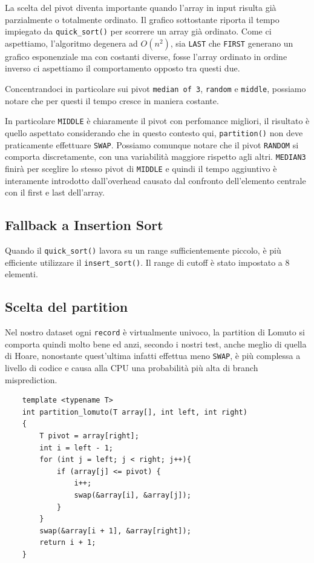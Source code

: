 \documentclass[12pt, letterpaper]{report}
\begin{document}
La scelta del pivot diventa importante quando l'array in input risulta già
parzialmente o totalmente ordinato.
Il grafico sottostante riporta il tempo impiegato da \verb|quick_sort()| 
per scorrere un array già ordinato. Come ci aspettiamo, l'algoritmo degenera ad
$O(n^2)$, sia \verb|LAST| che \verb|FIRST| generano un grafico esponenziale ma con
costanti diverse, fosse l'array ordinato in ordine inverso ci aspettiamo il comportamento
opposto tra questi due.
\begin{figure}[H]
\centering
    
\end{figure}
Concentrandoci in particolare sui pivot \verb|median of 3|, \verb|random| e \verb|middle|, 
possiamo notare che per questi il tempo cresce in maniera costante.  
\begin{figure}[H]
\centering
    
\end{figure}
In particolare \verb|MIDDLE| è chiaramente il pivot con perfomance migliori, 
il risultato è quello aspettato considerando che in questo contesto qui, 
\verb|partition()| non deve praticamente effettuare \verb|SWAP|. 
Possiamo comunque notare che il pivot \verb|RANDOM| si comporta discretamente, 
con una variabilità maggiore rispetto agli altri. \verb|MEDIAN3|
finirà per sceglire lo stesso pivot di \verb|MIDDLE| e quindi il tempo aggiuntivo
è interamente introdotto dall'overhead causato dal confronto dell'elemento centrale
con il first e last dell'array.

\newpage
\subsection{Fallback a Insertion Sort}
Quando il \verb|quick_sort()| lavora su un range sufficientemente piccolo, è più
efficiente utilizzare il \verb|insert_sort()|. Il range di cutoff è stato impostato a 8 elementi.

\subsection{Scelta del partition}
Nel nostro dataset ogni \verb|record| è virtualmente univoco, la partition di Lomuto
si comporta quindi molto bene ed anzi, secondo i nostri test, anche meglio di quella
di Hoare, nonostante quest'ultima infatti effettua meno \verb|SWAP|, è più complessa a
livello di codice e causa alla CPU una probabilità più alta di branch misprediction.

\begin{lstlisting}
    template <typename T>
    int partition_lomuto(T array[], int left, int right)
    {
        T pivot = array[right];
        int i = left - 1;
        for (int j = left; j < right; j++){
            if (array[j] <= pivot) {
                i++;
                swap(&array[i], &array[j]);
            }
        }
        swap(&array[i + 1], &array[right]);
        return i + 1;
    }
\end{lstlisting}
\end{document}
